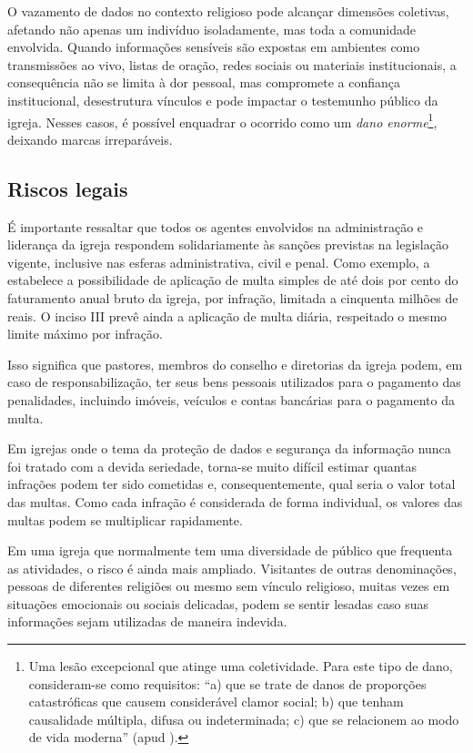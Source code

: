 O vazamento de dados no contexto religioso pode alcançar dimensões coletivas, afetando não apenas um indivíduo isoladamente, mas toda a comunidade envolvida. Quando informações sensíveis são expostas em ambientes como transmissões ao vivo, listas de oração, redes sociais ou materiais institucionais, a consequência não se limita à dor pessoal, mas compromete a confiança institucional, desestrutura vínculos e pode impactar o testemunho público da igreja. Nesses casos, é possível enquadrar o ocorrido como um \textit{dano enorme}\footnote{Uma lesão excepcional que atinge uma coletividade. Para este tipo de dano, consideram-se como requisitos: ``a) que se trate de danos de proporções catastróficas que causem considerável clamor social; b) que tenham causalidade múltipla, difusa ou indeterminada; c) que se relacionem ao modo de vida moderna'' (apud ).}, deixando marcas irreparáveis.

\subsection{Riscos legais}

É importante ressaltar que todos os agentes envolvidos na administração e liderança da igreja respondem solidariamente às sanções previstas na legislação vigente, inclusive nas esferas administrativa, civil e penal. Como exemplo, a  estabelece a possibilidade de aplicação de multa simples de até dois por cento do faturamento anual bruto da igreja, por infração, limitada a cinquenta milhões de reais. O inciso III prevê ainda a aplicação de multa diária, respeitado o mesmo limite máximo por infração.

Isso significa que pastores, membros do conselho e diretorias da igreja podem, em caso de responsabilização, ter seus bens pessoais utilizados para o pagamento das penalidades, incluindo imóveis, veículos e contas bancárias para o pagamento da multa.

Em igrejas onde o tema da proteção de dados e segurança da informação nunca foi tratado com a devida seriedade, torna-se muito difícil estimar quantas infrações podem ter sido cometidas e, consequentemente, qual seria o valor total das multas. Como cada infração é considerada de forma individual, os valores das multas podem se multiplicar rapidamente.

Em uma igreja que normalmente tem uma diversidade de público que frequenta as atividades, o risco é ainda mais ampliado. Visitantes de outras denominações, pessoas de diferentes religiões ou mesmo sem vínculo religioso, muitas vezes em situações emocionais ou sociais delicadas, podem se sentir lesadas caso suas informações sejam utilizadas de maneira indevida.

